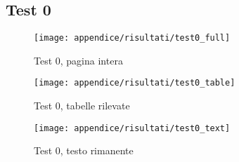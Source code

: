 \newpage
\subsection{Test 0}
\begin{figure}[H] 
    \centering
    \texttt{[image: appendice/risultati/test0\_full]} 
    \caption{Test 0, pagina intera}
    \label{img:test-0-full}
\end{figure} 
\newpage
\begin{figure}[H]  
        \centering  
        \texttt{[image: appendice/risultati/test0\_table]}  
        \caption{Test 0, tabelle rilevate}
\end{figure}
\begin{figure}[H]
        \centering  
        \texttt{[image: appendice/risultati/test0\_text]}  
        \caption{Test 0, testo rimanente}
\end{figure}%
